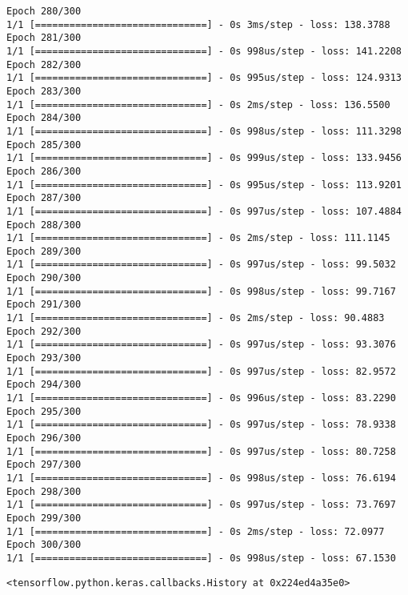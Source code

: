 \documentclass[11pt]{article}
\makeatletter
\newcommand{\boxspacing}{\kern\kvtcb@left@rule\kern\kvtcb@boxsep}
\newcommand{\prompt}[4]{
        \ttfamily\llap{{\color{#2}[#3]:\hspace{3pt}#4}}\vspace{-\baselineskip}
    }
\makeatother
\begin{document}
\begin{Verbatim}[commandchars=\\\{\}]
Epoch 280/300
1/1 [==============================] - 0s 3ms/step - loss: 138.3788
Epoch 281/300
1/1 [==============================] - 0s 998us/step - loss: 141.2208
Epoch 282/300
1/1 [==============================] - 0s 995us/step - loss: 124.9313
Epoch 283/300
1/1 [==============================] - 0s 2ms/step - loss: 136.5500
Epoch 284/300
1/1 [==============================] - 0s 998us/step - loss: 111.3298
Epoch 285/300
1/1 [==============================] - 0s 999us/step - loss: 133.9456
Epoch 286/300
1/1 [==============================] - 0s 995us/step - loss: 113.9201
Epoch 287/300
1/1 [==============================] - 0s 997us/step - loss: 107.4884
Epoch 288/300
1/1 [==============================] - 0s 2ms/step - loss: 111.1145
Epoch 289/300
1/1 [==============================] - 0s 997us/step - loss: 99.5032
Epoch 290/300
1/1 [==============================] - 0s 998us/step - loss: 99.7167
Epoch 291/300
1/1 [==============================] - 0s 2ms/step - loss: 90.4883
Epoch 292/300
1/1 [==============================] - 0s 997us/step - loss: 93.3076
Epoch 293/300
1/1 [==============================] - 0s 997us/step - loss: 82.9572
Epoch 294/300
1/1 [==============================] - 0s 996us/step - loss: 83.2290
Epoch 295/300
1/1 [==============================] - 0s 997us/step - loss: 78.9338
Epoch 296/300
1/1 [==============================] - 0s 997us/step - loss: 80.7258
Epoch 297/300
1/1 [==============================] - 0s 998us/step - loss: 76.6194
Epoch 298/300
1/1 [==============================] - 0s 997us/step - loss: 73.7697
Epoch 299/300
1/1 [==============================] - 0s 2ms/step - loss: 72.0977
Epoch 300/300
1/1 [==============================] - 0s 998us/step - loss: 67.1530
    \end{Verbatim}

            \begin{tcolorbox}[breakable, size=fbox, boxrule=.5pt, pad at break*=1mm, opacityfill=0]
\prompt{Out}{outcolor}{65}{\boxspacing}
\begin{Verbatim}[commandchars=\\\{\}]
<tensorflow.python.keras.callbacks.History at 0x224ed4a35e0>
\end{Verbatim}
\end{tcolorbox}
        
\end{document}
